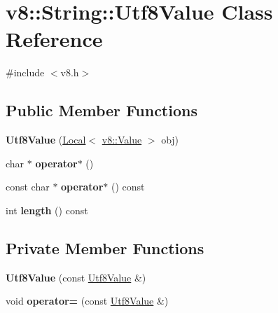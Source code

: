 \hypertarget{classv8_1_1_string_1_1_utf8_value}{}\section{v8\+:\+:String\+:\+:Utf8\+Value Class Reference}
\label{classv8_1_1_string_1_1_utf8_value}


{\ttfamily \#include $<$v8.\+h$>$}

\subsection*{Public Member Functions}
\begin{DoxyCompactItemize}
\item 
{\bfseries Utf8\+Value} (\hyperlink{classv8_1_1_local}{Local}$<$ \hyperlink{classv8_1_1_value}{v8\+::\+Value} $>$ obj)\hypertarget{classv8_1_1_string_1_1_utf8_value_ab1a11cc4d69082dfb2b9dd2dc319cfa8}{}\label{classv8_1_1_string_1_1_utf8_value_ab1a11cc4d69082dfb2b9dd2dc319cfa8}

\item 
char $\ast$ {\bfseries operator$\ast$} ()\hypertarget{classv8_1_1_string_1_1_utf8_value_a6cb4914bc426bbe60b0dfdff32213e59}{}\label{classv8_1_1_string_1_1_utf8_value_a6cb4914bc426bbe60b0dfdff32213e59}

\item 
const char $\ast$ {\bfseries operator$\ast$} () const \hypertarget{classv8_1_1_string_1_1_utf8_value_a6557ad0916c472faebd8bfdc3da5c4f7}{}\label{classv8_1_1_string_1_1_utf8_value_a6557ad0916c472faebd8bfdc3da5c4f7}

\item 
int {\bfseries length} () const \hypertarget{classv8_1_1_string_1_1_utf8_value_a1e2572abf6adc0786769482df9906f19}{}\label{classv8_1_1_string_1_1_utf8_value_a1e2572abf6adc0786769482df9906f19}

\end{DoxyCompactItemize}
\subsection*{Private Member Functions}
\begin{DoxyCompactItemize}
\item 
{\bfseries Utf8\+Value} (const \hyperlink{classv8_1_1_string_1_1_utf8_value}{Utf8\+Value} \&)\hypertarget{classv8_1_1_string_1_1_utf8_value_aa105ff6589ee517c79e7ead130a91654}{}\label{classv8_1_1_string_1_1_utf8_value_aa105ff6589ee517c79e7ead130a91654}

\item 
void {\bfseries operator=} (const \hyperlink{classv8_1_1_string_1_1_utf8_value}{Utf8\+Value} \&)\hypertarget{classv8_1_1_string_1_1_utf8_value_aae202b07a8cf9d52985fcd51f6245846}{}\label{classv8_1_1_string_1_1_utf8_value_aae202b07a8cf9d52985fcd51f6245846}

\end{DoxyCompactItemize}
